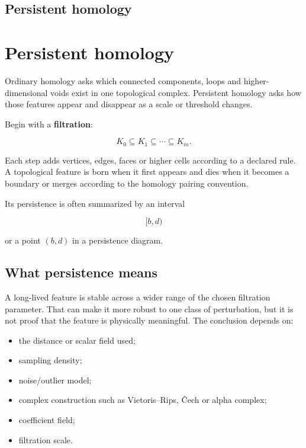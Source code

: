 \hypertarget{appendix-e4d8ed8d6787}{}
\section*{Persistent homology}
\chapter{Persistent homology}\label{appendix-e4d8ed8d6787-persistent-homology}

Ordinary homology asks which connected components, loops and higher-dimensional voids exist in one topological complex. Persistent homology asks how those features appear and disappear as a scale or threshold changes.

Begin with a \textbf{filtration}:

\[
K_0\subseteq K_1\subseteq\cdots\subseteq K_m.
\]

Each step adds vertices, edges, faces or higher cells according to a declared rule. A topological feature is born when it first appears and dies when it becomes a boundary or merges according to the homology pairing convention.

Its persistence is often summarized by an interval

\[
[b,d)
\]

or a point \((b,d)\) in a persistence diagram.

\section{What persistence means}\label{appendix-e4d8ed8d6787-what-persistence-means}

A long-lived feature is stable across a wider range of the chosen filtration parameter. That can make it more robust to one class of perturbation, but it is not proof that the feature is physically meaningful. The conclusion depends on:

\begin{itemize}
\tightlist
\item
  the distance or scalar field used;
\item
  sampling density;
\item
  noise/outlier model;
\item
  complex construction such as Vietoris--Rips, Čech or alpha complex;
\item
  coefficient field;
\item
  filtration scale.
\end{itemize}

